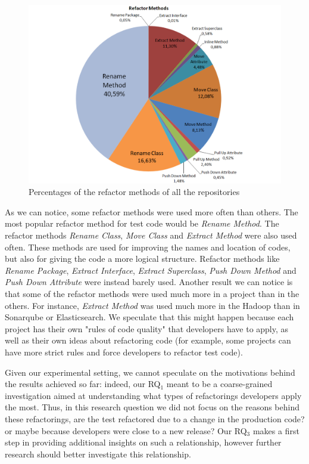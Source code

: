 \begin{figure}[!ht]
 \centering
 \includegraphics[width=\columnwidth]{resources/refactorMethods.pdf}
 \caption{Percentages of the refactor methods of all the repositories}
 \label{figure:piechart}
\end{figure}

As we can notice, some refactor methods were used more often than others. The most popular refactor method for test code would be \textit{Rename Method}. The refactor methods \textit{Rename Class}, \textit{Move Class} and \textit{Extract Method} were also used often. These methods are used for improving the names and location of codes, but also for giving the code a more logical structure. Refactor methods like \textit{Rename Package}, \textit{Extract Interface}, \textit{Extract Superclass}, \textit{Push Down Method} and \textit{Push Down Attribute} were instead barely used. Another result we can notice is that some of the refactor methods were used much more in a project than in the others. For instance, \textit{Extract Method} was used much more in the Hadoop than in Sonarqube or Elasticsearch. We speculate that this might happen because each project has their own "rules of code quality" that developers have to apply, as well as their own ideas about refactoring code (for example, some projects can have more strict rules and force developers to refactor test code).

Given our experimental setting, we cannot speculate on the motivations behind the results achieved so far: indeed, our RQ$_1$ meant to be a coarse-grained investigation aimed at understanding what types of refactorings developers apply the most. Thus, in this research question we did not focus on the reasons behind these refactorings, \eg are the test refactored due to a change in the production code? or maybe because developers were close to a new release? Our RQ$_3$ makes a first step in providing additional insights on such a relationship, however further research should better investigate this relationship.

